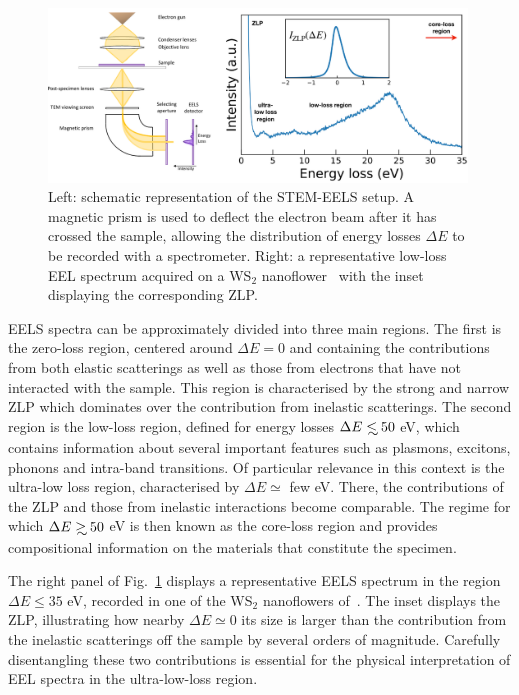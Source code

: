 \begin{figure}[t]
  \centering
  \includegraphics[width=0.99\textwidth]{plots/EELS.pdf}
  \caption{Left: schematic representation of the STEM-EELS setup.
    A magnetic
    prism is used to deflect the electron beam after it has crossed the sample,
   allowing the distribution of energy losses $\Delta E$ to be recorded
    with a spectrometer.
    Right: a representative low-loss EEL spectrum acquired 
    on a WS$_2$ nanoflower~\cite{SabryaWS2} with
    the inset displaying the corresponding ZLP.
  }
  \label{fig:EELS}
\end{figure}

EELS spectra can be approximately divided into three main regions.
%
The first is the zero-loss region, centered around $\Delta E=0$
and containing the contributions from both elastic scatterings
as well as those from electrons that have not interacted with the
sample.
%
This region is characterised by the strong and narrow ZLP
which dominates over the contribution
from inelastic scatterings.
%
The second region is the low-loss region, defined for energy losses
$\Delta E \lsim 50$ eV, which contains information
about several important features such as plasmons, excitons, phonons and
intra-band transitions.
%
Of particular relevance in this context is the ultra-low loss region, characterised by $\Delta E \simeq$ few eV.
%
There, the contributions of the ZLP and those from inelastic interactions
become comparable.
%
The regime for which $\Delta E \gsim 50$ eV is then known as the core-loss region and
provides compositional information
on the materials that constitute the specimen.

The right panel of Fig.~\ref{fig:EELS} displays
a representative EELS spectrum in the region $\Delta E \le 35$ eV, recorded
in one of the WS$_2$ nanoflowers of~\cite{SabryaWS2}.
%
The inset displays the ZLP, illustrating how nearby $\Delta E\simeq 0$
its size is larger than the contribution from the inelastic scatterings
off the sample by several orders of magnitude.
%
Carefully disentangling these two contributions 
is essential for the physical interpretation of EEL spectra in the ultra-low-loss region.

